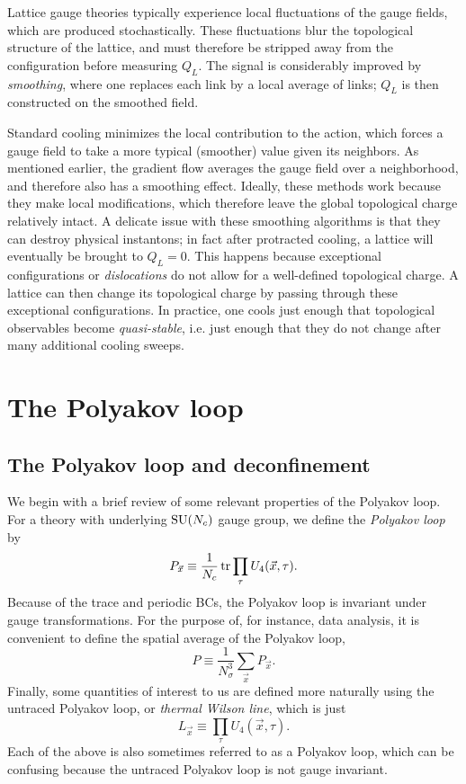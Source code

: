 Lattice gauge theories typically experience
local fluctuations of the gauge fields, which are produced stochastically. 
These fluctuations blur the topological structure of the lattice, and 
must therefore be stripped away from the configuration before measuring 
$Q_L$. The signal is considerably improved by 
{\it smoothing}, where one replaces each link by a local average of links; 
$Q_L$ is then constructed on the smoothed field. 

Standard cooling minimizes the local contribution
to the action, which forces a gauge field to take a more typical
(smoother) value given its neighbors.
As mentioned earlier, the gradient flow averages the gauge field over 
a neighborhood, and therefore also has a smoothing effect. 
Ideally, these methods work because they make local modifications,
which therefore leave the global topological charge relatively intact.
A delicate issue with these smoothing algorithms is that they can destroy 
physical instantons; in fact after protracted cooling, a lattice will
eventually be brought to $Q_L=0$. This happens because
exceptional configurations or 
{\it dislocations} do not allow
for a well-defined topological charge. A lattice can then change
its topological charge by passing through these exceptional configurations.
In practice, one cools just enough
that topological observables become {\it quasi-stable}, i.e. just
enough that they do not change after many additional cooling sweeps.

\section{The Polyakov loop}

\subsection{The Polyakov loop and deconfinement}
We begin with a brief review of some relevant properties of the
Polyakov loop. For a theory with underlying $\operatorname{SU}(N_c)$ gauge group, we define
the {\it Polyakov loop} by
\begin{equation}\label{eq:ploop}
  P_{\vec{x}}\equiv\frac{1}{N_c}\tr\prod_\tau U_4(\vec{x},\tau).
\end{equation}
Because of the trace and periodic BCs, the Polyakov loop is invariant under
gauge transformations. For the purpose of, for instance, data analysis, it
is convenient to define the spatial average of the Polyakov loop,
\begin{equation}\label{eq:ploopav}
  P\equiv\frac{1}{N_\sigma^3}\sum_{\vec{x}}P_{\vec{x}}.
\end{equation}
Finally, some quantities of interest to us are defined more
naturally using the untraced Polyakov loop, or {\it thermal Wilson line}, 
 which is just
\begin{equation}\label{eq:untracedPolyakov}
  L_{\vec{x}}\equiv\prod_\tau U_4(\vec{x},\tau).
\end{equation}
Each of the above is also sometimes referred to as a Polyakov
loop, which can be confusing because the untraced Polyakov loop is not
gauge invariant.

